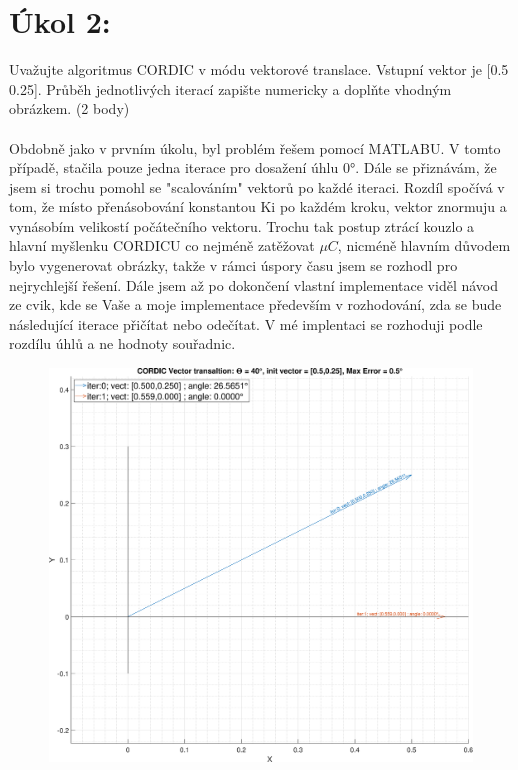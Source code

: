 \documentclass[10pt, a4paper]{article}%
\begin{document}
	\section{\Large Úkol 2:}
	Uvažujte algoritmus CORDIC v módu vektorové translace. Vstupní vektor je [0.5  0.25].
	Průběh jednotlivých iterací zapište numericky a doplňte vhodným obrázkem. (2 body)\\\\
	Obdobně jako v prvním úkolu, byl problém řešem pomocí MATLABU. V tomto případě,
	stačila pouze jedna iterace pro dosažení úhlu 0°. Dále se přiznávám, že jsem si trochu 
	pomohl se "scalováním" vektorů po každé iteraci. Rozdíl spočívá v tom, že místo přenásobování
	konstantou Ki po každém kroku, vektor znormuju a vynásobím velikostí počátečního vektoru. Trochu tak postup ztrácí kouzlo
	a hlavní myšlenku CORDICU co nejméně zatěžovat $\mu C$, nicméně hlavním důvodem bylo vygenerovat obrázky, takže 
	v rámci úspory času jsem se rozhodl pro nejrychlejší řešení. Dále jsem až po dokončení vlastní implementace viděl
	návod ze cvik, kde se Vaše a moje implementace především v rozhodování, zda se bude následující iterace přičítat nebo odečítat.
	V mé implentaci se rozhoduji podle rozdílu úhlů a ne hodnoty souřadnic.
	\begin{figure}[ht!]
		\centering
		\includegraphics[width = 1\textwidth]{CORDIC_vect_trans.eps}
		
	\end{figure}
\clearpage
\end{document}
